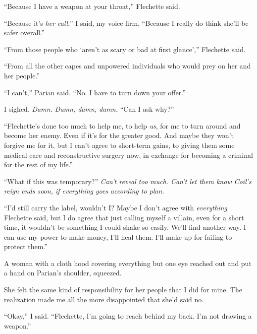 ``Because I have a weapon at your throat,'' Flechette said.



``Because it's \emph{her call},'' I said, my voice firm.  ``Because I really do think she'll be safer overall.''



``From those people who `aren't as scary or bad at first glance','' Flechette said.



``From all the other capes and unpowered individuals who would prey on her and her people.''



``I can't,'' Parian said.  ``No.  I have to turn down your offer.''



I sighed.  \emph{Damn.  Damn, damn, damn.  }``Can I ask why?''



``Flechette's done too much to help me, to help \emph{us}, for me to turn around and become her enemy.  Even if it's for the greater good.  And maybe they won't forgive me for it, but I can't agree to short-term gains, to giving them some medical care and reconstructive surgery now, in exchange for becoming a criminal for the rest of my life.''



``What if this was temporary?''  \emph{Can't reveal too much.  Can't let them know Coil's reign ends soon, if everything goes according to plan}.



``I'd still carry the label, wouldn't I?  Maybe I don't agree with \emph{everything} Flechette said, but I do agree that just calling myself a villain, even for a short time, it wouldn't be something I could shake so easily.  We'll find another way.  I can use my power to make money, I'll heal them.  I'll make up for failing to protect them.''



A woman with a cloth hood covering everything but one eye reached out and put a hand on Parian's shoulder, squeezed.



She felt the same kind of responsibility for her people that I did for mine.  The realization made me all the more disappointed that she'd said no.



``Okay,'' I said.  ``Flechette, I'm going to reach behind my back.  I'm not drawing a weapon.''



